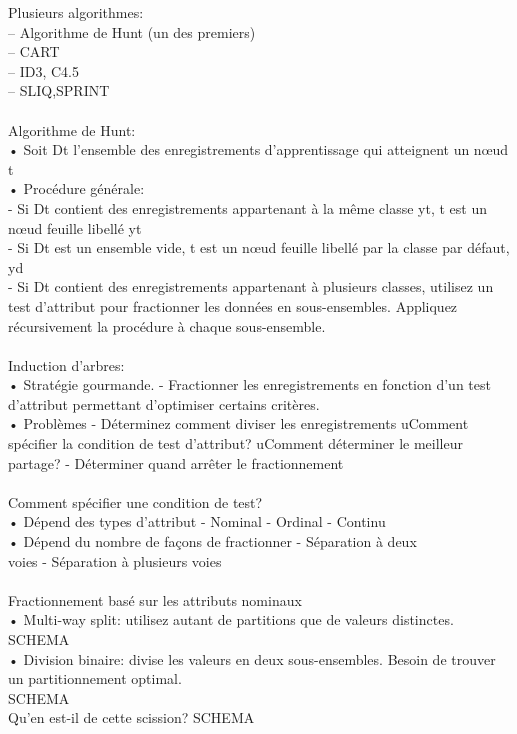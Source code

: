 \documentclass[5pt]{article}
\begin{document}
\begin{scriptsize}
Plusieurs algorithmes:\\
– Algorithme de Hunt (un des premiers)\\
– CART\\
– ID3, C4.5\\
– SLIQ,SPRINT\\
\\
Algorithme de Hunt:\\
• Soit Dt l'ensemble des enregistrements d'apprentissage qui atteignent un nœud t\\
• Procédure générale:\\
- Si Dt contient des enregistrements appartenant à la même classe yt, t est un nœud feuille libellé yt\\
- Si Dt est un ensemble vide, t est un nœud feuille libellé par la classe par défaut, yd\\
- Si Dt contient des enregistrements appartenant à plusieurs classes, utilisez un test d'attribut pour fractionner les données en sous-ensembles. Appliquez récursivement la procédure à chaque sous-ensemble.\\
\\
Induction d'arbres:\\
• Stratégie gourmande. - Fractionner les enregistrements en fonction d'un test d'attribut permettant d'optimiser certains critères.\\
• Problèmes - Déterminez comment diviser les enregistrements uComment spécifier la condition de test d'attribut? uComment déterminer le meilleur partage? - Déterminer quand arrêter le fractionnement\\
\\
Comment spécifier une condition de test?\\
• Dépend des types d'attribut - Nominal - Ordinal - Continu\\
• Dépend du nombre de façons de fractionner - Séparation à deux\\ voies - Séparation à plusieurs voies\\
\\
Fractionnement basé sur les attributs nominaux\\
• Multi-way split: utilisez autant de partitions que de valeurs distinctes.\\
SCHEMA\\
• Division binaire: divise les valeurs en deux sous-ensembles. Besoin de trouver un partitionnement optimal.\\
SCHEMA\\
Qu'en est-il de cette scission?
SCHEMA\\

\end{scriptsize}
\end{document}
